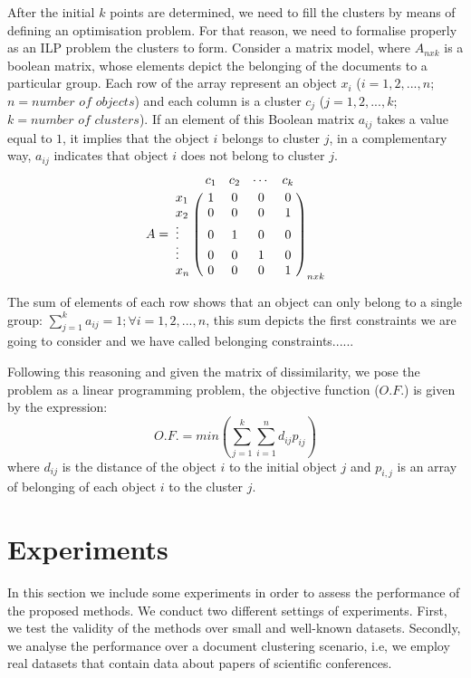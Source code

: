 \documentclass[procedia]{easychair}
\begin{document}
After the initial $k$ points are determined, we need to fill the clusters by means of defining an optimisation problem. For that reason, we need to formalise properly as an ILP problem the clusters to form. Consider a matrix model, where $A_{nxk}$ is a boolean matrix, whose elements depict the belonging of the documents to a particular group. Each row of the array represent an object $x_{i}$ ($i=1,2,...,n$; $n=number$ $of$ $objects$) and each column is a cluster $c_{j}$ ($j=1,2,...,k$; $k=number$ $of$ $clusters$). If an element of this Boolean matrix $a_{ij}$ takes a value equal to $1$, it implies that the object $i$ belongs to cluster $j$, in a complementary way, $a_{ij}$ indicates that object $i$ does not belong to cluster $j$.
$$A=
\bordermatrix{
            & c_1     & c_2    & \cdots & c_k   \cr
    x_1     & 1       & 0      & 0      & 0     \cr
    x_2     & 0       & 0      & 0      & 1     \cr
    \vdots  & 0       & 1      & 0      & 0     \cr
    \vdots  & 0       & 0      & 1      & 0     \cr
    x_n     & 0       & 0      & 0      & 1     \cr
            }_{nxk}
$$ 

The sum of elements of each row shows that an object can only belong to a single group: $\sum_{j=1}^k a_{ij}=1 ; \forall i=1,2,...,n $, this sum depicts the first constraints we are going to consider and we have called belonging constraints...... 

Following this reasoning and given the matrix of dissimilarity, we pose the problem as a linear programming problem, the objective function ($O.F.$) is given by the expression: 
$$O.F. = min (\sum_{j=1}^k \sum_{i=1}^n d_{ij}p_{ij})$$
where $d_{ij}$ is the distance of the object $i$ to the initial object $j$ and $p_{i,j}$ is an array of belonging of each object $i$ to the cluster $j$.


\section{Experiments}
\label{sect:experiments}
In this section we include some experiments in order to assess the performance of the proposed methods. We conduct two different settings of experiments. First, we test the validity of the methods over small and well-known datasets. Secondly, we analyse the performance over a document clustering scenario, i.e, we employ real datasets that contain data about papers of scientific conferences.

\end{document}
